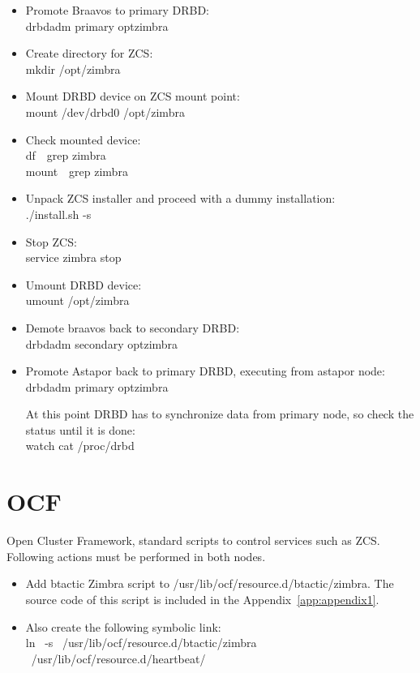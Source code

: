 \documentclass[a4paper, 12pt]{book}
\begin{document}
\begin{itemize}
	\item Promote Braavos to primary DRBD:\\
		drbdadm primary optzimbra
		
	\item Create directory for ZCS:\\
		mkdir   /opt/zimbra
		
	\item Mount DRBD device on ZCS mount point:\\
		mount   /dev/drbd0   /opt/zimbra
	
	\item Check mounted device:\\
		df\  \textbar \ grep zimbra\\
		mount\  \textbar \ grep zimbra
		
	\item Unpack ZCS installer and proceed with a dummy installation:\\
		./install.sh -s
		
	\item Stop ZCS:\\
		service zimbra stop
	
	\item Umount DRBD device:\\
		umount   /opt/zimbra
		
	\item Demote braavos back to secondary DRBD:\\
		drbdadm secondary optzimbra
		
	\item Promote Astapor back to primary DRBD, executing from astapor node:\\
		drbdadm primary optzimbra
		
\noindent At this point DRBD has to synchronize data from primary node, so check the status until it is done:\\
	watch cat /proc/drbd
	
\end{itemize}

\section{OCF}
\label{sec:ocf}

\noindent Open Cluster Framework, standard scripts to control services such as ZCS. Following actions must be performed in both nodes.

\begin{itemize}
	\item Add btactic Zimbra script to /usr/lib/ocf/resource.d/btactic/zimbra. The source code of this script is included in the Appendix~\ref{app:appendix1}.\\

	\item Also create the following symbolic link:\\
		ln \ -s \ /usr/lib/ocf/resource.d/btactic/zimbra \ /usr/lib/ocf/resource.d/heartbeat/
\end{itemize}
\end{document}
